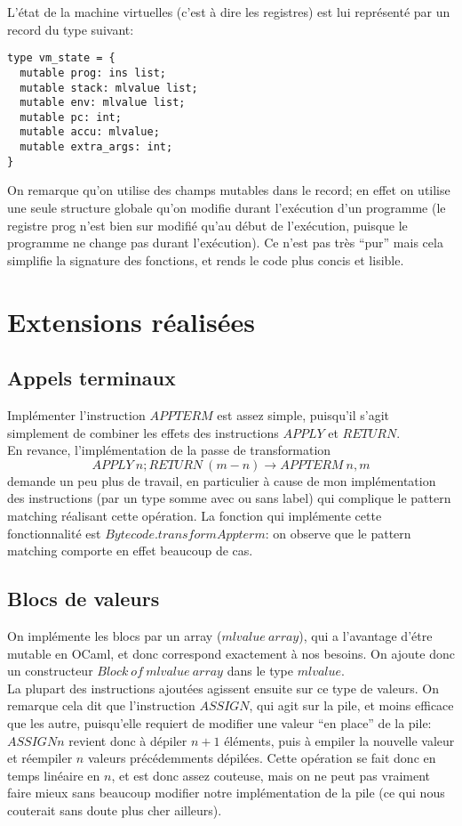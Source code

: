 \documentclass{article}
\begin{document}
L'état de la machine virtuelles (c'est à dire les registres) est lui représenté par un record du type suivant:
\begin{lstlisting}
type vm_state = {
  mutable prog: ins list;
  mutable stack: mlvalue list;
  mutable env: mlvalue list;
  mutable pc: int;
  mutable accu: mlvalue;
  mutable extra_args: int;
}
\end{lstlisting}
On remarque qu'on utilise des champs mutables dans le record; en effet on utilise une seule structure globale qu'on modifie durant l'exécution d'un programme (le registre prog n'est bien sur modifié qu'au début de l'exécution, puisque le programme ne change pas durant l'exécution). Ce n'est pas très ``pur'' mais cela simplifie la signature des fonctions, et rends le code plus concis et lisible.

\section{Extensions réalisées}

\subsection{Appels terminaux}
Implémenter l'instruction $APPTERM$ est assez simple, puisqu'il s'agit simplement de combiner les effets des instructions $APPLY$ et $RETURN$.\\
En revance, l'implémentation de la passe de transformation $$APPLY\:n;RETURN\:(m-n) \rightarrow APPTERM\:n,m$$ demande un peu plus de travail, en particulier à cause de mon implémentation des instructions (par un type somme avec ou sans label) qui complique le pattern matching réalisant cette opération. La fonction qui implémente cette fonctionnalité est $Bytecode.transformAppterm$: on observe que le pattern matching comporte en effet beaucoup de cas.

\subsection{Blocs de valeurs}
On implémente les blocs par un array ($mlvalue\:array$), qui a l'avantage d'étre mutable en OCaml, et donc correspond exactement à nos besoins. On ajoute donc un constructeur $Block\:of\:mlvalue\:array$ dans le type $mlvalue$.\\
La plupart des instructions ajoutées agissent ensuite sur ce type de valeurs. On remarque cela dit que l'instruction $ASSIGN$, qui agit sur la pile, et moins efficace que les autre, puisqu'elle requiert de modifier une valeur ``en place'' de la pile: $ASSIGN n$ revient donc à dépiler $n+1$ éléments, puis à empiler la nouvelle valeur et réempiler $n$ valeurs précédemments dépilées. Cette opération se fait donc en temps linéaire en $n$, et est donc assez couteuse, mais on ne peut pas vraiment faire mieux sans beaucoup modifier notre implémentation de la pile (ce qui nous couterait sans doute plus cher ailleurs).
\end{document}
